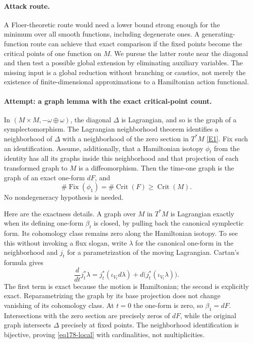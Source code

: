 \documentclass[11pt,a4paper]{article}
\newcommand{\eref}[2]{\hyperlink{extra:#1:#2}{[E#2]}}
\numberwithin{equation}{section}
\begin{document}
\paragraph{Attack route.}
A Floer-theoretic route would need a lower bound strong enough for the
minimum over all smooth functions, including degenerate ones. A generating-
function route can achieve that exact comparison if the fixed points become
the critical points of one function on $M$. We pursue the latter route near
the diagonal and then test a possible global extension by eliminating
auxiliary variables. The missing input is a global reduction without
branching or caustics, not merely the existence of finite-dimensional
approximations to a Hamiltonian action functional.

\paragraph{Attempt: a graph lemma with the exact critical-point count.}
In $(M\times M,-\omega\oplus\omega)$, the diagonal $\Delta$ is
Lagrangian, and so is the graph of a symplectomorphism. The Lagrangian
neighborhood theorem identifies a neighborhood of $\Delta$ with a
neighborhood of the zero section in $T^*M$ \eref{30006772}{1}. Fix such an
identification. Assume, additionally, that a Hamiltonian isotopy $\phi_t$
from the identity has all its graphs inside this neighborhood and that
projection of each transformed graph to $M$ is a diffeomorphism.
Then the time-one graph is the graph of an exact one-form $dF$, and
\begin{equation}\label{eq178-local}
                     \#\operatorname{Fix}(\phi_1)
                         =\#\operatorname{Crit}(F)
                         \ge\operatorname{Crit}(M).
\end{equation}
No nondegeneracy hypothesis is needed.

Here are the exactness details. A graph over $M$ in $T^*M$ is Lagrangian
exactly when its defining one-form $\beta_t$ is closed, by pulling back
the canonical symplectic form. Its cohomology class remains zero along the
Hamiltonian isotopy. To see this without invoking a flux slogan, write
$\lambda$ for the canonical one-form in the neighborhood and $j_t$ for a
parametrization of the moving Lagrangian. Cartan's formula gives
\[
 \frac{d}{dt}j_t^*\lambda
 =j_t^*(\iota_{V_t}d\lambda)+d\bigl(j_t^*(\iota_{V_t}\lambda)\bigr).
\]
The first term is exact because the motion is Hamiltonian; the second is
explicitly exact. Reparametrizing the graph by its base projection does not
change vanishing of its cohomology class. At $t=0$ the one-form is zero,
so $\beta_1=dF$. Intersections with the zero section are precisely zeros
of $dF$, while the original graph intersects $\Delta$ precisely at fixed
points. The neighborhood identification is bijective, proving
\eqref{eq178-local} with cardinalities, not multiplicities.
\end{document}
